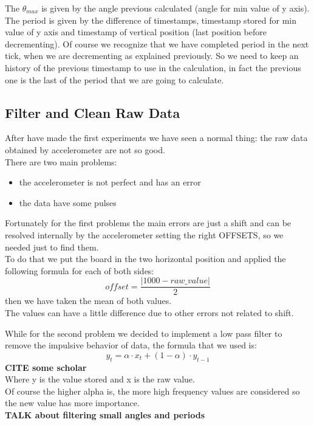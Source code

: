 The $\theta_{max}$ is given by the  angle previous calculated (angle for min value of y axis).\\
The period is given by the difference of timestamps, timestamp stored for min value of y axis and timestamp of vertical position (last position before decrementing).
Of course we recognize that we have completed period in the next tick, when we are decrementing as explained previously. So we need to keep an history of the previous timestamp to use in the calculation, in fact the previous one is the last of the period that we are going to calculate.

\subsection{Filter and Clean Raw Data}
After have made the first experiments we have seen a normal thing: the raw data obtained by accelerometer are not so good.\\
There are two main problems:
\begin{itemize}
	\item the accelerometer is not perfect and has an error
	\item the data have some pulses
\end{itemize} \par

Fortunately for the first problems the main errors are just a shift and can be resolved internally by the accelerometer setting the right OFFSETS, so we needed just to find them.\\
To do that we put the board in the two horizontal position and applied the following formula for each of both sides:
$$ offset = \frac{\left|1000-raw\_value\right|}{2}$$
then we have taken the mean of both values. \\
The values can have a little difference due to other errors not related to shift.\par

While for the second problem we decided to implement a low pass filter to remove the impulsive behavior of data, the formula that we used is:
$$ y_t = \alpha \cdot x_t + (1-\alpha) \cdot y_{t-1}$$
\textbf{CITE some scholar}\\
Where y is the value stored and x is the raw value.\\
Of course the higher alpha is, the more high frequency values are considered so the new value has more importance.\\
\textbf{TALK about filtering small angles and periods}

